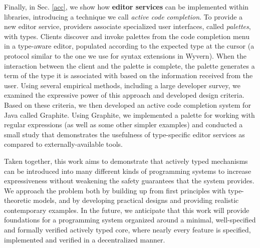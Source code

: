 Finally, in Sec. \ref{acc}, we show how \textbf{editor services} can be implemented within libraries, introducing a technique we call \emph{active code completion}. To provide a new editor service, providers associate
specialized user interfaces, called \emph{palettes}, with types. Clients discover and invoke palettes from the code completion menu in a type-aware editor, populated according to the expected type at the cursor (a protocol similar to the one we use for syntax extensions in Wyvern). When the interaction between the client and the palette is complete, the palette generates a term of the type it is associated with based on the information received from the user. Using several empirical
methods, including a large developer survey, we examined the expressive power of this approach and developed design criteria. Based on these criteria, we then developed an active code completion system for Java called Graphite. Using Graphite,
we implemented a palette for working with regular expressions (as well as some other simpler examples) and conducted a small study that demonstrates the usefulness of type-specific editor services as compared to externally-available tools.

Taken together, this work aims to demonstrate that actively typed mechanisms can be introduced into many different kinds of programming systems to increase expressiveness without  weakening the safety guarantees that the system provides. We approach the problem both by building up from first principles with type-theoretic models, and by developing practical designs and providing realistic contemporary examples.  
In the future, we anticipate that this work will provide foundations for a programming system organized around a minimal, well-specified and formally verified actively typed core, where nearly every feature is specified, implemented and verified in a decentralized manner. 

